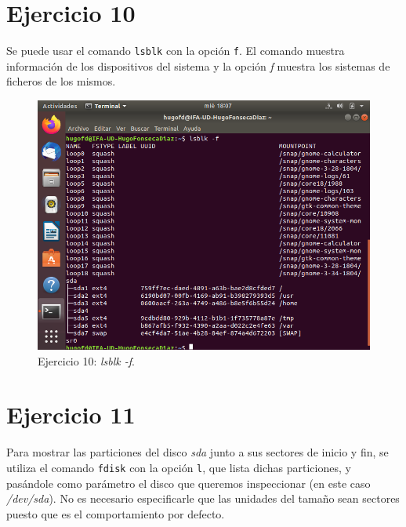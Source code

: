 \documentclass[11pt]{article}
\begin{document}
\section{Ejercicio 10}
Se puede usar el comando \verb|lsblk| con la opción \verb|f|. El comando muestra información de los dispositivos del sistema y la opción \textit{f} muestra los sistemas de ficheros de los mismos.

\begin{figure}[H]
    \caption{Ejercicio 10: \textit{lsblk -f}.}
  \centering
  \includegraphics{e10.png}
\end{figure}

\section{Ejercicio 11}
Para mostrar las particiones del disco \textit{sda} junto a sus sectores de inicio y fin, se utiliza el comando \verb|fdisk| con la opción \verb|l|, que lista dichas particiones, y pasándole como parámetro el disco que queremos inspeccionar (en este caso \textit{/dev/sda}). No es necesario especificarle que las unidades del tamaño sean sectores puesto que es el comportamiento por defecto.
\end{document}

